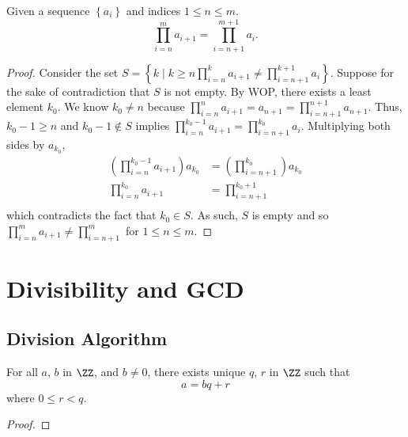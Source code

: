 \begin{lemma}\label{prod_re_index}
    Given a sequence $\left\{a_i\right\}$ and indices $1\leq n\leq m$.
    \begin{equation*}
        \prod_{i=n}^m a_{i+1}=\prod_{i=n+1}^{m+1} a_i.
    \end{equation*}
\end{lemma}
\begin{proof}
    Consider the set $S=\left\{k \mid k\geq n \prod_{i=n}^k a_{i+1}\neq\prod_{i=n+1}^{k+1} a_i\right\}$. Suppose for the sake of contradiction that $S$ is not empty. By WOP, there exists a least element $k_0$. We know $k_0\neq n$ because $\prod_{i=n}^n a_{i+1}=a_{n+1}=\prod_{i=n+1}^{n+1} a_{n+1}$. Thus, $k_0-1\geq n$ and $k_0-1\notin S$ implies $\prod_{i=n}^{k_0-1} a_{i+1}=\prod_{i=n+1}^{k_0} a_i$. Multiplying both sides by $a_{k_0}$, 
    \begin{equation*}
        \begin{aligned}
            \left(\prod_{i=n}^{k_0-1} a_{i+1}\right)a_{k_0}&=\left(\prod_{i=n+1}^{k_0}\right) a_{k_0}\\
        \prod_{i=n}^{k_0} a_{i+1}&=\prod_{i=n+1}^{k_0+1}\\
        \end{aligned}
    \end{equation*}
    which contradicts the fact that $k_0\in S$. As such, $S$ is empty and so $\prod_{i=n}^m a_{i+1}\neq\prod_{i=n+1}^{m}$ for $1\leq n\leq m$.
\end{proof}









\newpage
\section{Divisibility and GCD}
\subsection{Division Algorithm}
\begin{theorem} \label{division_alg}
    For all $a$, $b$ in $\ZZ$, and $b \neq 0$, there exists unique $q$, $r$ in $\ZZ$ such that
    \[a=bq+r\]
where $0 \leq r<q$.
\end{theorem}
\begin{proof} 
    
\end{proof}

